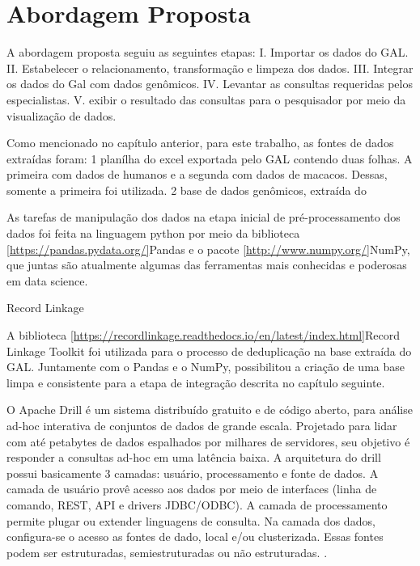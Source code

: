 \chapter{Abordagem Proposta}

A abordagem proposta seguiu as seguintes etapas:
I.	Importar os dados do GAL.
II.	Estabelecer o relacionamento, transformação e limpeza dos dados.
III.	Integrar os dados do Gal com dados genômicos.
IV.	Levantar as consultas requeridas pelos especialistas.
V.	exibir o resultado das consultas para o pesquisador por meio da visualização de dados.


Como mencionado no capítulo anterior, para este trabalho, as fontes de dados extraídas foram:
1 planílha do excel exportada pelo GAL contendo duas folhas. A primeira com dados de humanos e a segunda com dados de macacos. Dessas, somente a primeira foi utilizada.
2 base de dados genômicos, extraída do \cite{federhen2011ncbi}


As tarefas de manipulação dos dados na etapa inicial de pré-processamento dos dados foi feita na linguagem python por meio da biblioteca \ref{https://pandas.pydata.org/}{Pandas} e o pacote \ref{http://www.numpy.org/}{NumPy}, que juntas são atualmente algumas das ferramentas mais conhecidas e poderosas em data science.

Record Linkage

A biblioteca \ref{https://recordlinkage.readthedocs.io/en/latest/index.html}{Record Linkage Toolkit} foi utilizada para o processo de deduplicação na base extraída do GAL. Juntamente com o Pandas e o NumPy, possibilitou a criação de uma base limpa e consistente para a etapa de integração descrita no capítulo seguinte.

O Apache Drill é um sistema distribuído gratuito e de código aberto, para análise ad-hoc interativa de conjuntos de dados de grande escala. Projetado para lidar com até
petabytes de dados espalhados por milhares de servidores, seu objetivo é responder a consultas ad-hoc em uma latência baixa.
A arquitetura do drill possui basicamente 3 camadas: usuário, processamento e fonte de dados.
A camada de usuário provê acesso aos dados por meio de interfaces (linha de comando, REST, API e drivers JDBC/ODBC). A camada de processamento permite plugar ou extender linguagens de consulta. Na camada dos dados, configura-se  o acesso as fontes de dado, local e/ou clusterizada. Essas fontes podem ser estruturadas, semiestruturadas ou não estruturadas. \cite{hausenblas2013apache}.